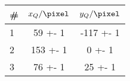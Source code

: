 \begin{tabular}{lSS}
\toprule

{\#} & {$x_Q / \si{\pixel}$} & {$y_Q / \si{\pixel}$} \\

\midrule

1 & 59 +- 1 & -117 +- 1 \\
2 & 153 +- 1 & 0 +- 1 \\
3 & 76 +- 1 & 25 +- 1 \\

\bottomrule
\end{tabular}